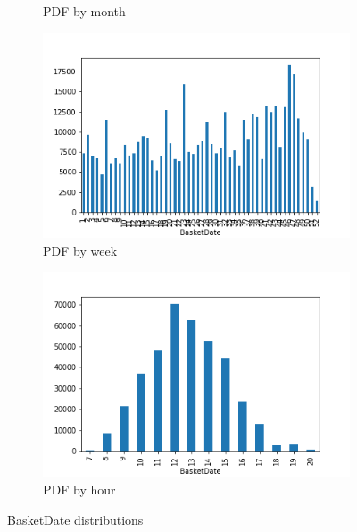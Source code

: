 \begin{figure}[!h]
\begin{subfigure}{.33\textwidth}
\caption{PDF by month}
\label{fig:month_bar}
\end{subfigure}
\begin{subfigure}{.33\textwidth}
\centering
\includegraphics[width=.7\textwidth]{img/understanding/week_bar.png}
\caption{PDF by week}
\label{fig:week_bar}
\end{subfigure}
\begin{subfigure}{.33\textwidth}
\centering
\includegraphics[width=.7\textwidth]{img/understanding/hour_bar.png}
\caption{PDF by hour}
\label{fig:hour_bar}
\end{subfigure}
\caption{BasketDate distributions}
\end{figure}

